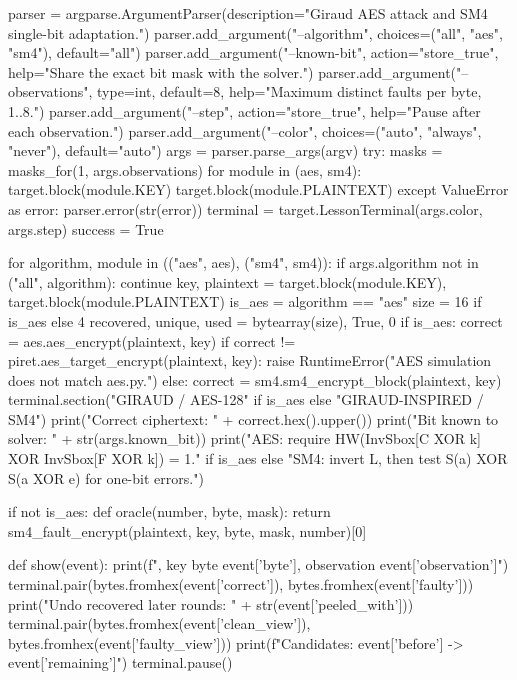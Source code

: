\begin{lightcode}[numbers=left,firstnumber=1]
    parser = argparse.ArgumentParser(description="Giraud AES attack and SM4 single-bit adaptation.")
    parser.add_argument("--algorithm", choices=("all", "aes", "sm4"), default="all")
    parser.add_argument("--known-bit", action="store_true", help="Share the exact bit mask with the solver.")
    parser.add_argument("--observations", type=int, default=8, help="Maximum distinct faults per byte, 1..8.")
    parser.add_argument("--step", action="store_true", help="Pause after each observation.")
    parser.add_argument("--color", choices=("auto", "always", "never"), default="auto")
    args = parser.parse_args(argv)
    try:
        masks = masks_for(1, args.observations)
        for module in (aes, sm4):
            target.block(module.KEY)
            target.block(module.PLAINTEXT)
    except ValueError as error:
        parser.error(str(error))
    terminal = target.LessonTerminal(args.color, args.step)
    success = True

    for algorithm, module in (("aes", aes), ("sm4", sm4)):
        if args.algorithm not in ("all", algorithm):
            continue
        key, plaintext = target.block(module.KEY), target.block(module.PLAINTEXT)
        is_aes = algorithm == "aes"
        size = 16 if is_aes else 4
        recovered, unique, used = bytearray(size), True, 0
        if is_aes:
            correct = aes.aes_encrypt(plaintext, key)
            if correct != piret.aes_target_encrypt(plaintext, key):
                raise RuntimeError("AES simulation does not match aes.py.")
        else:
            correct = sm4.sm4_encrypt_block(plaintext, key)
        terminal.section("GIRAUD / AES-128" if is_aes else "GIRAUD-INSPIRED / SM4")
        print("Correct ciphertext: " + correct.hex().upper())
        print("Bit known to solver: " + str(args.known_bit))
        print("AES: require HW(InvSbox[C XOR k] XOR InvSbox[F XOR k]) = 1." if is_aes else "SM4: invert L, then test S(a) XOR S(a XOR e) for one-bit errors.")

        if not is_aes:
            def oracle(number, byte, mask):
                return sm4_fault_encrypt(plaintext, key, byte, mask, number)[0]

            def show(event):
                print(f", key byte {event['byte']}, observation {event['observation']}")
                terminal.pair(bytes.fromhex(event['correct']), bytes.fromhex(event['faulty']))
                print("Undo recovered later rounds: " + str(event['peeled_with']))
                terminal.pair(bytes.fromhex(event['clean_view']), bytes.fromhex(event['faulty_view']))
                print(f"Candidates: {event['before']} -> {event['remaining']}")
                terminal.pause()


\end{lightcode}
